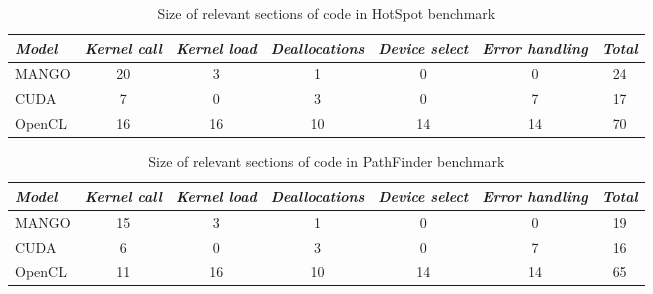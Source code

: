 \begin{table}
    \centering
    \begin{tabular}{l|c|c|c|c|c|c}
    \textit{Model} & \textit{Kernel call} & \textit{Kernel load} & \textit{Deallocations} & \textit{Device select} & \textit{Error handling} & \textit{Total} \\ \hline
    MANGO & 20 & 3 & 1 & 0 & 0 & 24 \\
    CUDA & 7 & 0 & 3 & 0 & 7 & 17 \\
    OpenCL & 16 & 16 & 10 & 14 & 14 & 70  
    \end{tabular}
    \captionsetup{justification=centering}
    \caption{Size of relevant sections of code in HotSpot benchmark}
    \label{tab:hotspot-factors-loc}
\end{table}

\begin{table}
    \centering
    \begin{tabular}{l|c|c|c|c|c|c}
    \textit{Model} & \textit{Kernel call} & \textit{Kernel load} & \textit{Deallocations} & \textit{Device select} & \textit{Error handling} & \textit{Total} \\ \hline
    MANGO & 15 & 3 & 1 & 0 & 0 & 19 \\
    CUDA & 6 & 0 & 3 & 0 & 7 & 16 \\
    OpenCL & 11 & 16 & 10 & 14 & 14 & 65  
    \end{tabular}
    \captionsetup{justification=centering}
    \caption{Size of relevant sections of code in PathFinder benchmark}
    \label{tab:pathfinder-factors-loc}
\end{table}

